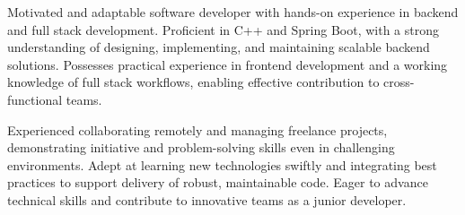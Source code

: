 
Motivated and adaptable software developer with hands-on experience in backend and full stack development. Proficient in C++ and Spring Boot, with a strong understanding of designing, implementing, and maintaining scalable backend solutions. Possesses practical experience in frontend development and a working knowledge of full stack workflows, enabling effective contribution to cross-functional teams.

Experienced collaborating remotely and managing freelance projects, demonstrating initiative and problem-solving skills even in challenging environments. Adept at learning new technologies swiftly and integrating best practices to support delivery of robust, maintainable code. Eager to advance technical skills and contribute to innovative teams as a junior developer.
